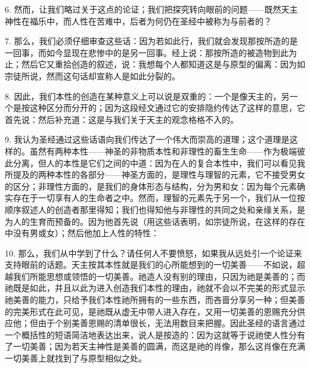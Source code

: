 6. 然而，让我们略过关于这点的论证；我们把探究转向眼前的问题——既然天主神性在福乐中，而人性在苦难中，后者为何仍在圣经中被称为与前者的？\par

7. 那么，我们必须仔细审查这些话：因为若如此行，我们就会发现那按所造的是一回事，而如今显现在悲惨中的是另一回事。经上说：那按所造的被造物到此为止；然后它又重拾创造的叙述，说：我想每个人都知道这是与原型的偏离：因为如宗徒所说，然而这句话却宣称人是如此分裂的。\par

8. 因此，我们本性的创造在某种意义上可以说是双重的：一个是像天主的，另一个是按这种区分而分开的；因为这段经文通过它的安排隐约传达了这样的意思，它首先说：然后补充道：这是与我们关于天主的观念格格不入的。\par

9. 我认为圣经通过这些话语向我们传达了一个伟大而崇高的道理；这个道理是这样的。虽然有两种本性——神圣的非物质本性和非理性的畜生生命——作为极端彼此分离，但人的本性是它们之间的中道：因为在人的复合本性中，我们可以看见我所提及的两种本性的各部分——神圣方面的，是理性与理智的元素，它不接受男女的区分；非理性方面的，是我们的身体形态与结构，分为男和女：因为每个元素确实存在于一切享有人的生命者之中。然而，理智的元素先于另一个，我们从一位按顺序叙述人的创造者那里得知；我们也得知他与非理性的共同之处和亲缘关系，是为人的生育而预备的。因为他首先说（用这些话表明，如宗徒所说，在这样的存在中没有男或女）；然后他加上人性的特性：\par

10. 那么，我们从中学到了什么？请任何人不要愤怒，如果我从远处引一个论证来支持眼前的话题。天主按其本性就是我们的心所能想到的一切美善——不如说，超越我们所能思想或领悟的一切美善。祂造人没有别的理由，只因为祂是美善的；而祂既是如此，并且以此为进入创造我们本性的理由，祂就不会以不完美的形式显示祂美善的能力，只给予我们本性祂所拥有的一些东西，而吝啬分享另一种；但美善的完美形式在此可见，是祂既从虚无中带人进入存在，又用一切美善的恩赐充分供应他；但由于个别美善恩赐的清单很长，无法用数目来把握。因此圣经的语言通过一个概括性的短语简洁地表达出来，说人是按造的：因为这就等于说祂使人性分有了一切美善；因为若天主神性是美善的圆满，而这是祂的肖像，那么这肖像在充满一切美善上就找到了与原型相似之处。\par

